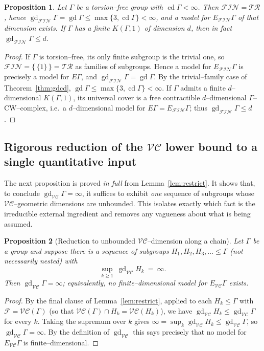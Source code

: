 \documentclass{amsart}
\newtheorem{proposition}{Proposition}
\theoremstyle{definition}
\newcommand{\FIN}{\mathcal{F\!I\!N}}
\newcommand{\VC}{\mathcal{V\!C}}
\newcommand{\gd}{\operatorname{gd}}
\newcommand{\cd}{\operatorname{cd}}
\begin{document}
\begin{proposition}\label{prop:finside}
Let $\Gamma$ be a torsion--free group with $\cd\Gamma<\infty$. Then $\FIN=\mathcal{TR}$, hence
$\gd_{\FIN}\Gamma=\gd\Gamma\le\max\{3,\cd\Gamma\}<\infty$, and a model for $E_{\FIN}\Gamma$ of
that dimension exists. If $\Gamma$ has a finite $K(\Gamma,1)$ of dimension $d$, then in fact
$\gd_{\FIN}\Gamma\le d$.
\end{proposition}

\begin{proof}
If $\Gamma$ is torsion--free, its only finite subgroup is the trivial one, so
$\FIN=\{\,\{1\}\,\}=\mathcal{TR}$ as families of subgroups. Hence a model for $E_{\FIN}\Gamma$
is precisely a model for $E\Gamma$, and $\gd_{\FIN}\Gamma=\gd\Gamma$. By the trivial--family
case of Theorem~\ref{thm:gdcd}, $\gd\Gamma\le\max\{3,\cd\Gamma\}<\infty$. If $\Gamma$ admits a
finite $d$--dimensional $K(\Gamma,1)$, its universal cover is a free contractible
$d$--dimensional $\Gamma$--CW--complex, i.e.\ a $d$--dimensional model for
$E\Gamma=E_{\FIN}\Gamma$; thus $\gd_{\FIN}\Gamma\le d$.
\end{proof}

\subsection{Rigorous reduction of the \texorpdfstring{$\VC$}{VC} lower bound to a single
quantitative input}\label{subsec:reduction}

The next proposition is proved \emph{in full} from Lemma~\ref{lem:restrict}. It shows that, to
conclude $\gd_{\VC}\Gamma=\infty$, it suffices to exhibit \emph{one} sequence of subgroups
whose $\VC$--geometric dimensions are unbounded. This isolates exactly which fact is the
irreducible external ingredient and removes any vagueness about what is being assumed.

\begin{proposition}[Reduction to unbounded $\VC$--dimension along a chain]\label{prop:reduction}
Let $\Gamma$ be a group and suppose there is a sequence of subgroups $H_1,H_2,H_3,\dots\le\Gamma$
(not necessarily nested) with
\[
\sup_{k\ge 1}\ \gd_{\VC}H_k\ =\ \infty .
\]
Then $\gd_{\VC}\Gamma=\infty$; equivalently, no finite--dimensional model for $E_{\VC}\Gamma$
exists.
\end{proposition}

\begin{proof}
By the final clause of Lemma~\ref{lem:restrict}, applied to each $H_k\le\Gamma$ with
$\mathcal F=\VC(\Gamma)$ (so that $\VC(\Gamma)\cap H_k=\VC(H_k)$), we have
$\gd_{\VC}H_k\le\gd_{\VC}\Gamma$ for every $k$. Taking the supremum over $k$ gives
$\infty=\sup_k\gd_{\VC}H_k\le\gd_{\VC}\Gamma$, so $\gd_{\VC}\Gamma=\infty$. By the definition
of $\gd_{\VC}$ this says precisely that no model for $E_{\VC}\Gamma$ is finite--dimensional.
\end{proof}
\end{document}
